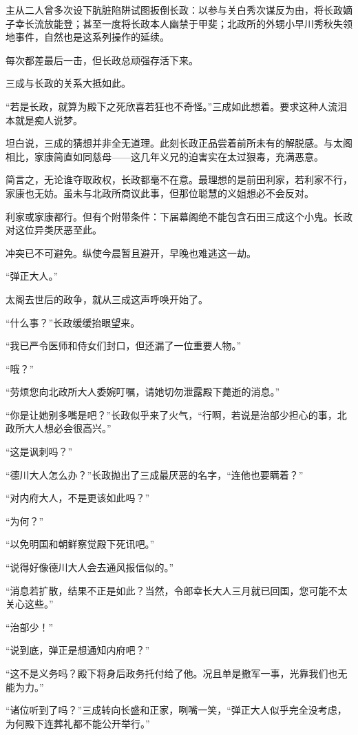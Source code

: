 \documentclass[
]{article}
\begin{document}
主从二人曾多次设下肮脏陷阱试图扳倒长政：以参与关白秀次谋反为由，将长政嫡子幸长流放能登；甚至一度将长政本人幽禁于甲斐；北政所的外甥小早川秀秋失领地事件，自然也是这系列操作的延续。

每次都差最后一击，但长政总顽强存活下来。

三成与长政的关系大抵如此。

``若是长政，就算为殿下之死欣喜若狂也不奇怪。''三成如此想着。要求这种人流泪本就是痴人说梦。

坦白说，三成的猜想并非全无道理。此刻长政正品尝着前所未有的解脱感。与太阁相比，家康简直如同慈母------这几年义兄的迫害实在太过狠毒，充满恶意。

简言之，无论谁夺取政权，长政都毫不在意。最理想的是前田利家，若利家不行，家康也无妨。虽未与北政所商议此事，但那位聪慧的义姐想必不会反对。

利家或家康都行。但有个附带条件：下届幕阁绝不能包含石田三成这个小鬼。长政对这位异类厌恶至此。

冲突已不可避免。纵使今晨暂且避开，早晚也难逃这一劫。

``弹正大人。''

太阁去世后的政争，就从三成这声呼唤开始了。

``什么事？''长政缓缓抬眼望来。

``我已严令医师和侍女们封口，但还漏了一位重要人物。''

``哦？''

``劳烦您向北政所大人委婉叮嘱，请她切勿泄露殿下薨逝的消息。''

``你是让她别多嘴是吧？''长政似乎来了火气，``行啊，若说是治部少担心的事，北政所大人想必会很高兴。''

``这是讽刺吗？''

``德川大人怎么办？''长政抛出了三成最厌恶的名字，``连他也要瞒着？''

``对内府大人，不是更该如此吗？''

``为何？''

``以免明国和朝鲜察觉殿下死讯吧。''

``说得好像德川大人会去通风报信似的。''

``消息若扩散，结果不正是如此？当然，令郎幸长大人三月就已回国，您可能不太关心这些。''

``治部少！''

``说到底，弹正是想通知内府吧？''

``这不是义务吗？殿下将身后政务托付给了他。况且单是撤军一事，光靠我们也无能为力。''

``诸位听到了吗？''三成转向长盛和正家，咧嘴一笑，``弹正大人似乎完全没考虑，为何殿下连葬礼都不能公开举行。''
\end{document}
